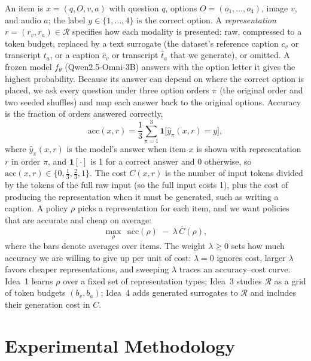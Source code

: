 \documentclass{article}
\begin{document}
An item is $x=(q,O,v,a)$ with question $q$, options $O=(o_1,\dots,o_4)$, image $v$,
and audio $a$; the label $y\in\{1,\dots,4\}$ is the correct option. A
\emph{representation} $r=(r_v,r_a)\in\mathcal{R}$ specifies how each modality is
presented: raw, compressed to a token budget, replaced by a text surrogate (the
dataset's reference caption $c_v$ or transcript $t_a$, or a caption $\hat c_v$ or
transcript $\hat t_a$ that we generate), or omitted. A frozen model $f_\theta$ (Qwen2.5-Omni-3B) answers with
the option letter it gives the highest probability. Because its answer can depend on
where the correct option is placed, we ask every question under three option orders
$\pi$ (the original order and two seeded shuffles) and map each answer back to the
original options. Accuracy is the fraction of orders answered correctly,
\begin{equation}
\mathrm{acc}(x,r)=\frac{1}{3}\sum_{\pi=1}^{3}\mathbf{1}\big[\hat y_\pi(x,r)=y\big],
\end{equation}
where $\hat y_\pi(x,r)$ is the model's answer when item $x$ is shown with
representation $r$ in order $\pi$, and $\mathbf{1}[\cdot]$ is 1 for a correct answer
and 0 otherwise, so $\mathrm{acc}(x,r)\in\{0,\tfrac13,\tfrac23,1\}$. The cost
$C(x,r)$ is the number of input tokens divided by the tokens of the full raw input (so
the full input costs 1), plus the cost of producing the representation when it must
be generated, such as writing a caption. A policy $\rho$ picks a representation for
each item, and we want policies that are accurate and cheap on average:
\begin{equation}
\max_{\rho}\ \ \overline{\mathrm{acc}}(\rho)\;-\;\lambda\,\overline{C}(\rho),
\end{equation}
where the bars denote averages over items. The weight $\lambda\ge0$ sets how much
accuracy we are willing to give up per unit of cost: $\lambda=0$ ignores cost, larger
$\lambda$ favors cheaper representations, and sweeping $\lambda$ traces an
accuracy--cost curve.
Idea~1 learns $\rho$ over a fixed set of representation types; Idea~3 studies
$\mathcal{R}$ as a grid of token budgets $(b_v,b_a)$; Idea~4 adds generated
surrogates to $\mathcal{R}$ and includes their generation cost in $C$.

\section{Experimental Methodology}
\label{sec:method}
\end{document}
